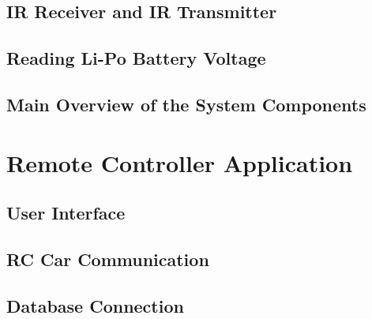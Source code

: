 \subsection{IR Receiver and IR Transmitter} \label{sec_ir_rx_tx}

\subsection{Reading Li-Po Battery Voltage} \label{sec_read_lipo_voltage}

\subsection{Main Overview of the System Components} \label{main_system_components}

\section{Remote Controller Application} \label{sec_remote_app}

\subsection{User Interface} \label{sec_user_interface}

\subsection{RC Car Communication} \label{sec_rc_comm}

\subsection{Database Connection} \label{sec_db_connection}



